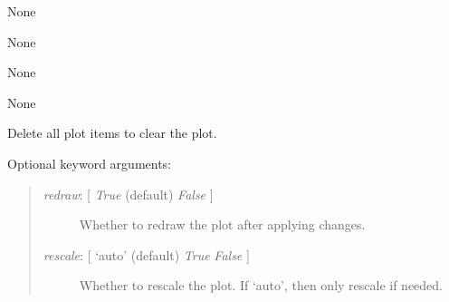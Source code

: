 \documentclass[letterpaper,10pt,english]{sphinxmanual}
\begin{document}
\begin{fulllineitems}
\begin{fulllineitems}
\begin{quote}
\begin{description}
\end{description}
\end{quote}

\end{fulllineitems}


\begin{fulllineitems}
\label{api:mpl.Plot2D.axes_enter_action}
None

\end{fulllineitems}


\begin{fulllineitems}
\label{api:mpl.Plot2D.axes_leave_action}
None

\end{fulllineitems}


\begin{fulllineitems}
\label{api:mpl.Plot2D.button_press_action}
None

\end{fulllineitems}


\begin{fulllineitems}
\label{api:mpl.Plot2D.button_release_action}
None

\end{fulllineitems}


\begin{fulllineitems}
\label{api:mpl.Plot2D.clear}
Delete all plot items to clear the plot.

Optional keyword arguments:
\begin{quote}
\begin{description}
\item[{\emph{redraw}: {[} \emph{True}  (default) \textbar{} \emph{False} {]}}] \leavevmode
Whether to redraw the plot after applying changes.

\item[{\emph{rescale}: {[} `auto' (default) \textbar{} \emph{True} \textbar{} \emph{False} {]}}] \leavevmode
Whether to rescale the plot. If `auto', then only rescale if needed.


\end{description}
\end{quote}
\end{fulllineitems}
\end{fulllineitems}
\end{document}
